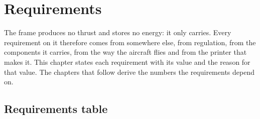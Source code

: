 \chapter{Requirements}\label{sec:requirements}

The frame produces no thrust and stores no energy: it only carries. Every requirement on it therefore comes from somewhere else, from regulation, from the components it carries, from the way the aircraft flies and from the printer that makes it. This chapter states each requirement with its value and the reason for that value. The chapters that follow derive the numbers the requirements depend on.

\section{Requirements table}\label{sec:req-table}

